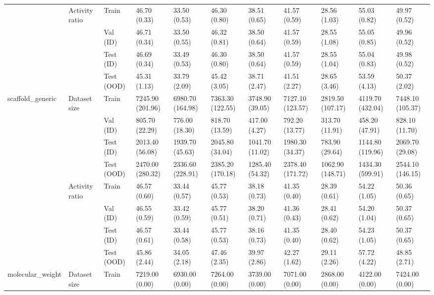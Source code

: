 \begin{tabular}{lllllllllll}
\cline{2-11}
 & \multirow[t]{4}{*}{Activity ratio} & Train & 46.70 (0.33) & 33.50 (0.53) & 46.30 (0.80) & 38.51 (0.65) & 41.57 (0.59) & 28.56 (1.03) & 55.03 (0.82) & 49.97 (0.52) \\
 &  & Val (ID) & 46.71 (0.34) & 33.50 (0.55) & 46.32 (0.81) & 38.50 (0.64) & 41.57 (0.59) & 28.55 (1.08) & 55.05 (0.85) & 49.96 (0.52) \\
 &  & Test (ID) & 46.69 (0.34) & 33.49 (0.53) & 46.30 (0.80) & 38.50 (0.64) & 41.57 (0.59) & 28.55 (1.04) & 55.04 (0.83) & 49.98 (0.52) \\
 &  & Test (OOD) & 45.31 (1.13) & 33.79 (2.09) & 45.42 (3.05) & 38.71 (2.47) & 41.51 (2.27) & 28.65 (3.46) & 53.59 (4.13) & 50.37 (2.02) \\
\cline{1-11} \cline{2-11}
\multirow[t]{8}{*}{scaffold_generic} & \multirow[t]{4}{*}{Dataset size} & Train & 7245.90 (201.96) & 6980.70 (164.98) & 7363.30 (122.55) & 3748.90 (39.05) & 7127.10 (123.57) & 2819.50 (107.17) & 4119.70 (432.04) & 7448.10 (105.37) \\
 &  & Val (ID) & 805.70 (22.29) & 776.00 (18.30) & 818.70 (13.59) & 417.00 (4.27) & 792.20 (13.77) & 313.70 (11.91) & 458.20 (47.91) & 828.10 (11.70) \\
 &  & Test (ID) & 2013.40 (56.08) & 1939.70 (45.63) & 2045.80 (34.04) & 1041.70 (11.02) & 1980.30 (34.37) & 783.90 (29.64) & 1144.80 (119.96) & 2069.70 (29.08) \\
 &  & Test (OOD) & 2470.00 (280.32) & 2336.60 (228.91) & 2385.20 (170.18) & 1285.40 (54.32) & 2378.40 (171.72) & 1062.90 (148.71) & 1434.30 (599.91) & 2544.10 (146.15) \\
\cline{2-11}
 & \multirow[t]{4}{*}{Activity ratio} & Train & 46.57 (0.60) & 33.44 (0.57) & 45.77 (0.53) & 38.18 (0.73) & 41.35 (0.40) & 28.39 (0.61) & 54.22 (1.05) & 50.36 (0.65) \\
 &  & Val (ID) & 46.55 (0.59) & 33.42 (0.59) & 45.77 (0.51) & 38.20 (0.71) & 41.36 (0.43) & 28.41 (0.62) & 54.20 (1.04) & 50.37 (0.65) \\
 &  & Test (ID) & 46.57 (0.61) & 33.44 (0.58) & 45.77 (0.53) & 38.16 (0.73) & 41.35 (0.40) & 28.40 (0.62) & 54.23 (1.05) & 50.37 (0.65) \\
 &  & Test (OOD) & 45.86 (2.44) & 34.05 (2.18) & 47.46 (2.35) & 39.97 (2.86) & 42.27 (1.62) & 29.11 (2.26) & 57.72 (4.22) & 48.85 (2.71) \\
\cline{1-11} \cline{2-11}
\multirow[t]{8}{*}{molecular_weight} & \multirow[t]{4}{*}{Dataset size} & Train & 7219.00 (0.00) & 6930.00 (0.00) & 7264.00 (0.00) & 3739.00 (0.00) & 7071.00 (0.00) & 2868.00 (0.00) & 4122.00 (0.00) & 7424.00 (0.00) \\

\end{tabular}
